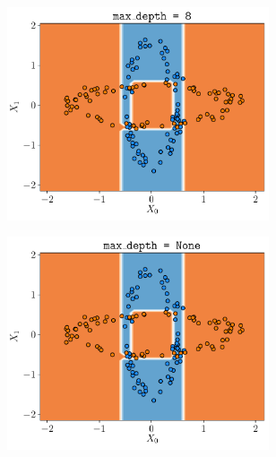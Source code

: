 \documentclass[a4paper, 12pt]{article}
\begin{document}
\begin{enumerate}[label = (\alph*)]
\begin{figure}[h]
\begin{subfigure}{0.49\textwidth}
        	    \includegraphics[width=0.85\textwidth]{resources/pdf/make_data1_depth8.pdf}
            \end{subfigure}
            \begin{subfigure}{0.49\textwidth}
                \centering
        	    \includegraphics[width=0.85\textwidth]{resources/pdf/make_data1_depthNone.pdf}
            \end{subfigure}
            \label{fig:decision_boundary_decision_tree_make_data1}
        \end{figure}
        

\end{enumerate}
\end{document}
